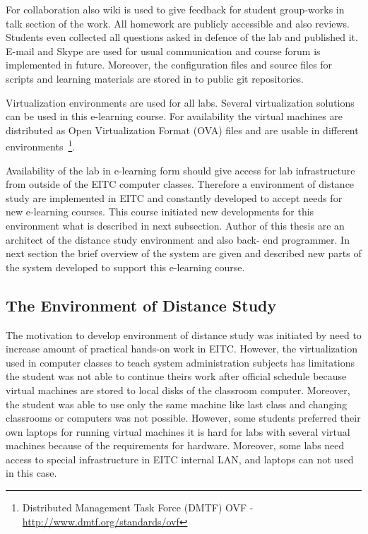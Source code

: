 For collaboration also wiki is used to give feedback for student group-works in talk section of the work. All homework are publicly accessible and also reviews. Students even collected all questions asked in defence of the lab and published it. E-mail and Skype are used for usual communication and course forum is implemented in future. Moreover, the configuration files and source files for scripts and learning materials are stored in to public \gls{git} repositories.

Virtualization environments are used for all labs. Several virtualization solutions can be used in this e-learning course. For availability the virtual machines are distributed as Open Virtualization Format (\gls{OVA}) files and are usable in different environments~\footnote{ Distributed Management Task Force (\gls{DMTF}) OVF - \url{http://www.dmtf.org/standards/ovf}}.

Availability of the lab in e-learning form should give access for lab infrastructure from outside of the \gls{EITC} computer classes. Therefore a environment of distance study are implemented in \gls{EITC} and constantly developed to accept needs for new e-learning courses. This course initiated new developments for this environment what is described in next subsection.
Author of this thesis are an architect of the distance study environment and also back- end programmer. In next section the brief overview of the system are given and described new parts of the system developed to support this e-learning course.

\subsection{The Environment of Distance Study}
\label{The Environment of Distance Study}
The motivation to develop environment of distance study was initiated by need to increase amount of practical hands-on work in \gls{EITC}. However, the virtualization used in computer classes to teach system administration subjects has limitations the student was not able to continue theirs work after official schedule because virtual machines are stored to local disks of the classroom computer. Moreover, the student was able to use only the same machine like last class and changing classrooms or computers was not possible. However, some students preferred their own laptops for running virtual machines it is hard for labs with several virtual machines because of the requirements for hardware. Moreover, some labs need access to special infrastructure in \gls{EITC} internal LAN, and laptops can not used in this case.

